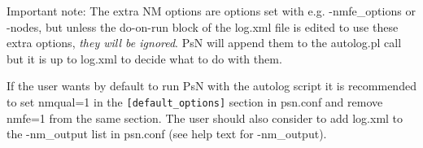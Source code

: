 \begin{optionlist}
Important note: The extra NM options are options set with e.g. -nmfe\_options or -nodes, but unless the
do-on-run block of the log.xml file is edited to use these extra options, 
\emph{they will be ignored}. PsN will append them to the autolog.pl call but it is up to log.xml to decide what to do with them.

If the user wants by default to run PsN with the autolog script it is recommended to set nmqual=1 in the
\verb|[default_options]| section in psn.conf and remove nmfe=1 from the same section. The user should also consider to add log.xml to the -nm\_output list in psn.conf (see help text for -nm\_output).
\nextopt
\end{optionlist}
